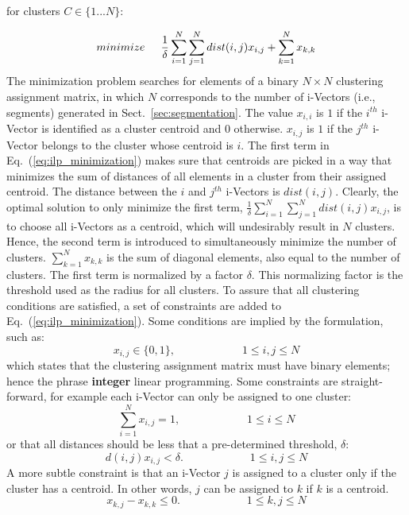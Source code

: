 for clusters $C \in \{1 ... N\}$:

\begin{equation}
\label{eq:ilp_minimization}
minimize \hspace{0.2in} \frac{1}{\delta}\sum\limits_{i=1}^{N}\sum\limits_{j=1}^{N}dist(i,j)x_{i,j} + \sum\limits_{k=1}^{N}x_{k,k}
\end{equation}
The minimization problem searches for elements of a binary $N\times N$ clustering assignment matrix, in which $N$ corresponds to the number of i-Vectors (i.e., segments) generated in Sect.~\ref{sec:segmentation}. 
The value $x_{i,i}$ is $1$ if the $i^{th}$ i-Vector is identified as a cluster centroid and $0$ otherwise. 
$x_{i,j}$ is $1$ if the $j^{th}$ i-Vector belongs to the cluster whose centroid is $i$. 
The first term in Eq.~(\ref{eq:ilp_minimization}) makes sure that centroids are picked in a way that minimizes the sum of distances of all elements in a cluster from their assigned centroid. 
The distance between the $i$ and $j^{th}$ i-Vectors is $dist(i,j)$. 
Clearly, the optimal solution to only minimize the first term, $\frac{1}{\delta}\sum\limits_{i=1}^{N}\sum\limits_{j=1}^{N}dist(i,j)x_{i,j}$, is to choose all i-Vectors as a centroid, which will undesirably result in $N$ clusters. 
Hence, the second term is introduced to simultaneously minimize the number of clusters. $\sum\limits_{k=1}^{N}x_{k,k}$ is the sum of diagonal elements, also equal to the number of clusters. 
The first term is normalized by a factor $\delta$. 
This normalizing factor is the threshold used as the radius for all clusters. 
To assure that all clustering conditions are satisfied, a set of constraints are added to Eq.~(\ref{eq:ilp_minimization}). 
Some conditions are implied by the formulation, such as: 
\begin{equation}
x_{i,j} \in \{0,1\},  \hspace{1in}  1 \leq i,j \leq N
\end{equation}
which states that the clustering assignment matrix must have binary elements; hence the phrase {\bf integer} linear programming. 
Some constraints are straight-forward, for example each i-Vector can only be assigned to one cluster: 
\begin{equation}
\sum\limits_{i=1}^{N}x_{i,j} = 1, \hspace{1in} 1 \leq i \leq N
\end{equation}
or that all distances should be less that a pre-determined threshold, $\delta$: 
\begin{equation}
d(i,j)x_{i,j} < \delta. \hspace{1in} 1 \leq i,j \leq N
\end{equation}
A more subtle constraint is that an i-Vector $j$ is assigned to a cluster only if the cluster has a centroid. In other words, $j$ can be assigned to $k$ if $k$ is a centroid. 
\begin{equation}
x_{k,j} - x_{k,k} \leq 0. \hspace{1in} 1 \leq k,j \leq N
\end{equation}

